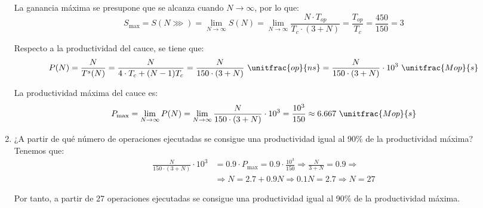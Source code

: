 \begin{ejercicio}
\begin{enumerate}
        La ganancia máxima se presupone que se alcanza cuando $N\to\infty$, por lo que:
        \begin{equation*}
            S_{\max} = S(N\ggg) = \lim_{N\to\infty} S(N) = \lim_{N\to\infty} \frac{N\cdot T_{op}}{T_c\cdot (3+N)} = \frac{T_{op}}{T_c} = \frac{450}{150} = 3
        \end{equation*}

        Respecto a la productividad del cauce, se tiene que:
        \begin{equation*}
            P(N) = \frac{N}{T^s(N)} = \frac{N}{4\cdot T_c + (N-1)T_c}
            = \frac{N}{150\cdot (3+N)}~\unitfrac{op}{ns}
            = \frac{N}{150\cdot (3+N)}\cdot 10^3~\unitfrac{Mop}{s}
        \end{equation*}

        La productividad máxima del cauce es:
        \begin{equation*}
            P_{\max} = \lim_{N\to\infty} P(N) = \lim_{N\to\infty} \frac{N}{150\cdot (3+N)}\cdot 10^3 = \frac{10^3}{150} \approx 6.667~\unitfrac{Mop}{s}
        \end{equation*}
        

        \item ¿A partir de qué número de operaciones ejecutadas se consigue una productividad igual
        al 90\% de la productividad máxima?\\

        Tenemos que:
        \begin{align*}
            \frac{N}{150\cdot (3+N)}\cdot 10^3 &= 0.9 \cdot P_{\max} = 0.9 \cdot \frac{10^3}{150}
            \Longrightarrow \frac{N}{3+N} = 0.9 \Longrightarrow\\&\Longrightarrow N = 2.7 + 0.9N \Longrightarrow 0.1N = 2.7 \Longrightarrow N = 27
        \end{align*}

        Por tanto, a partir de 27 operaciones ejecutadas se consigue una productividad igual al 90\% de la productividad máxima.
    \end{enumerate}
\end{ejercicio}


